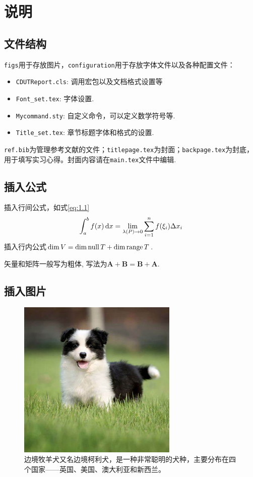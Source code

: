 \chapter{说明}

\section{文件结构}

\texttt{figs}用于存放图片，\texttt{configuration}用于存放字体文件以及各种配置文件：
\begin{itemize}
    \item \texttt{CDUTReport.cls}: 调用宏包以及文档格式设置等
    \item \texttt{Font\_set.tex}: 字体设置.
    \item \texttt{Mycommand.sty}: 自定义命令，可以定义数学符号等.
    \item \texttt{Title\_set.tex}: 章节标题字体和格式的设置.
\end{itemize}
\texttt{ref.bib}为管理参考文献的文件；\texttt{titlepage.tex}为封面；\texttt{backpage.tex}为封底，用于填写实习心得。封面内容请在\texttt{main.tex}文件中编辑.


\section{插入公式}
插入行间公式，如式\ref{eq:1.1}
\begin{equation}
    \int_{a}^{b} f(x) \mathop{}\!\mathrm{d} x = \lim_{\lambda(P) \to 0} \sum_{i=1}^n f(\xi_i) \Delta x_i  \label{eq:1.1}
\end{equation}
插入行内公式$\dim V = \dim \operatorname{null} T + \dim \operatorname{range} T$.

矢量和矩阵一般写为粗体, 写法为$\bm{A} + \bm{B} = \bm{B} + \bm{A}$.

\section{插入图片}
\begin{figure}[H]
    \centering
    \includegraphics[width=3in]{figs/fig0.jpeg}
    \caption{边境牧羊犬又名边境柯利犬，是一种非常聪明的犬种，主要分布在四个国家——英国、美国、澳大利亚和新西兰。}
    \label{fig: 1}
\end{figure}

